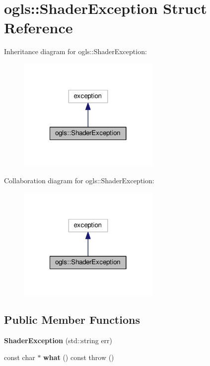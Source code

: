 \hypertarget{structogls_1_1ShaderException}{\section{ogls\-:\-:Shader\-Exception Struct Reference}
\label{structogls_1_1ShaderException}
}


Inheritance diagram for ogls\-:\-:Shader\-Exception\-:\nopagebreak
\begin{figure}[H]
\begin{center}
\leavevmode
\includegraphics[width=194pt]{d5/dc9/structogls_1_1ShaderException__inherit__graph}
\end{center}
\end{figure}


Collaboration diagram for ogls\-:\-:Shader\-Exception\-:\nopagebreak
\begin{figure}[H]
\begin{center}
\leavevmode
\includegraphics[width=194pt]{d1/df5/structogls_1_1ShaderException__coll__graph}
\end{center}
\end{figure}
\subsection*{Public Member Functions}
\begin{DoxyCompactItemize}
\item 
\hypertarget{structogls_1_1ShaderException_a0201786b9f03cf8d8c3314b6eb5fbee4}{{\bfseries Shader\-Exception} (std\-::string err)}\label{structogls_1_1ShaderException_a0201786b9f03cf8d8c3314b6eb5fbee4}

\item 
\hypertarget{structogls_1_1ShaderException_a021ae822f6a2d0e5105c4f9038275cf0}{const char $\ast$ {\bfseries what} () const   throw ()}\label{structogls_1_1ShaderException_a021ae822f6a2d0e5105c4f9038275cf0}

\end{DoxyCompactItemize}

